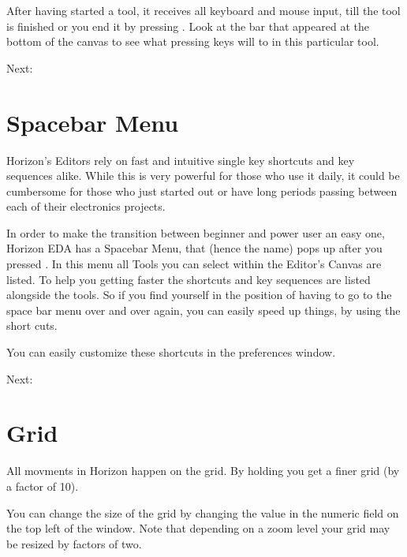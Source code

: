 \documentclass[letterpaper,10pt,czech]{sphinxmanual}
\begin{document}
After having started a tool, it receives all keyboard and mouse input, till the tool is finished or you end it by pressing .
Look at the bar that appeared at the bottom of the canvas to see what
pressing keys will to in this particular tool.

Next: {\hyperref[\detokenize{spacebar-menu::doc}]{}}


\chapter{Spacebar Menu}
\label{\detokenize{spacebar-menu:spacebar-menu}}\label{\detokenize{spacebar-menu::doc}}
Horizon’s Editors rely on fast and intuitive single key shortcuts and key sequences alike. While this is very powerful for those who use it daily, it could be cumbersome for those who just started out or have long periods passing between each of their electronics projects.

\noindent{}

In order to make the transition between beginner and power user an easy one, Horizon EDA has a Spacebar Menu, that (hence the name) pops up after you pressed . In this menu all Tools you can select within the Editor’s Canvas are listed. To help you getting faster the shortcuts and key sequences are listed alongside the tools. So if you find yourself in the position of having to go to the space bar menu over and over again, you can easily speed up things, by using the short cuts.

You can easily customize these shortcuts in the preferences window.

Next: {\hyperref[\detokenize{grid::doc}]{}}


\chapter{Grid}
\label{\detokenize{grid:grid}}\label{\detokenize{grid::doc}}
All movments in Horizon happen on the grid. By holding  you get a finer grid (by a factor of 10).

You can change the size of the grid by changing the value in the numeric field on the top left of the window. Note that depending on a zoom level your grid may be resized by factors of two.

\noindent{}
\end{document}
